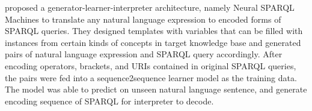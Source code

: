 \cite{Soru2018a,Soru2018} proposed a generator-learner-interpreter architecture, namely Neural SPARQL Machines to translate any natural language expression to encoded forms of SPARQL queries. They designed templates with variables that can be filled with instances from certain kinds of concepts in target knowledge base and generated pairs of natural language expression and SPARQL query accordingly. After encoding operators, brackets, and URIs contained in original SPARQL queries, the pairs were fed into a sequence2sequence learner model as the training data. The model was able to predict on unseen natural language sentence, and generate encoding sequence of SPARQL for interpreter to decode. 